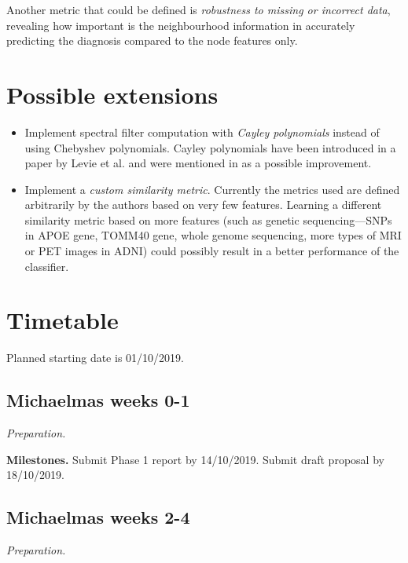 \documentclass[12pt,a4paper,twoside]{article}
\begin{document}
Another metric that could be defined is \textit{robustness to missing or incorrect data}, revealing how important is the neighbourhood information in accurately predicting the diagnosis compared to the node features only.

\section*{Possible extensions}
\begin{itemize}
  \item Implement spectral filter computation with \textit{Cayley polynomials} instead of using Chebyshev polynomials. Cayley polynomials have been introduced in a paper by Levie et al. \cite{levie2017cayleynets} and were mentioned in \cite{parisot2018disease} as a possible improvement.
  \item Implement a \textit{custom similarity metric}. Currently the metrics used are defined arbitrarily by the authors based on very few features. Learning a different similarity metric based on more features (such as genetic sequencing—SNPs in APOE gene, TOMM40 gene, whole genome sequencing, more types of MRI or PET images in ADNI) could possibly result in a better performance of the classifier.
\end{itemize}


\section*{Timetable}
\label{section:timetable}


Planned starting date is 01/10/2019.

\subsection*{Michaelmas weeks 0-1}
\textit{Preparation.}

\textbf{Milestones.} Submit Phase 1 report by 14/10/2019. Submit draft proposal by 18/10/2019.

\subsection*{Michaelmas weeks 2-4}
\textit{Preparation.}
\end{document}
